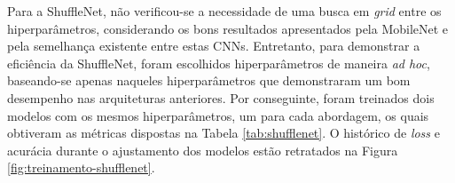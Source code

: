 Para a ShuffleNet, não verificou-se a necessidade de uma busca em \emph{grid} entre os hiperparâmetros, considerando os bons resultados apresentados pela MobileNet e pela semelhança existente entre estas CNNs. Entretanto, para demonstrar a eficiência da ShuffleNet, foram escolhidos hiperparâmetros de maneira \emph{ad hoc}, baseando-se apenas naqueles hiperparâmetros que demonstraram um bom desempenho nas arquiteturas anteriores. Por conseguinte, foram treinados dois modelos com os mesmos hiperparâmetros, um para cada abordagem, os quais obtiveram as métricas dispostas na Tabela \ref{tab:shufflenet}. O histórico de \emph{loss} e acurácia durante o ajustamento dos modelos estão retratados na Figura \ref{fig:treinamento-shufflenet}.

\begin{table}[h!]
\centering
\caption{Detalhamento dos modelos obtidos com a arquitetura ShuffleNet para cada uma das abordagens consideradas neste trabalho.}
\label{tab:shufflenet}
\end{table}
    
